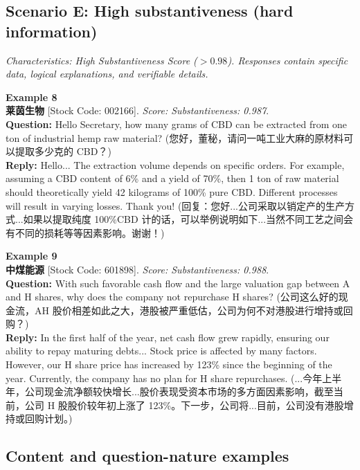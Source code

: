 \documentclass[12pt]{article}
\begin{document}
\subsection{Scenario E: High substantiveness (hard information)}
\textit{Characteristics: High Substantiveness Score ($> 0.98$). Responses contain specific data, logical explanations, and verifiable details.}
\vspace{0.3cm}

\noindent \textbf{Example 8} \\
\textbf{莱茵生物} [Stock Code: 002166]. \textit{Score: Substantiveness: 0.987}. \\
\textbf{Question:} Hello Secretary, how many grams of CBD can be extracted from one ton of industrial hemp raw material? (您好，董秘，请问一吨工业大麻的原材料可以提取多少克的 CBD？) \\
\textbf{Reply:} Hello... The extraction volume depends on specific orders. For example, assuming a CBD content of 6\% and a yield of 70\%, then 1 ton of raw material should theoretically yield 42 kilograms of 100\% pure CBD. Different processes will result in varying losses. Thank you! (回复：您好...公司采取以销定产的生产方式...如果以提取纯度 100\%CBD 计的话，可以举例说明如下...当然不同工艺之间会有不同的损耗等等因素影响。谢谢！)
\vspace{0.4cm}

\noindent \textbf{Example 9} \\
\textbf{中煤能源} [Stock Code: 601898]. \textit{Score: Substantiveness: 0.988}. \\
\textbf{Question:} With such favorable cash flow and the large valuation gap between A and H shares, why does the company not repurchase H shares? (公司这么好的现金流，AH 股价相差如此之大，港股被严重低估，公司为何不对港股进行增持或回购？) \\
\textbf{Reply:} In the first half of the year, net cash flow grew rapidly, ensuring our ability to repay maturing debts... Stock price is affected by many factors. However, our H share price has increased by 123\% since the beginning of the year. Currently, the company has no plan for H share repurchases. (...今年上半年，公司现金流净额较快增长...股价表现受资本市场的多方面因素影响，截至当前，公司 H 股股价较年初上涨了 123\%。下一步，公司将...目前，公司没有港股增持或回购计划。)

\clearpage
\newpage
\subsection{Content and question-nature examples}\label{app:topic_examples}

\clearpage

 
\end{document}
